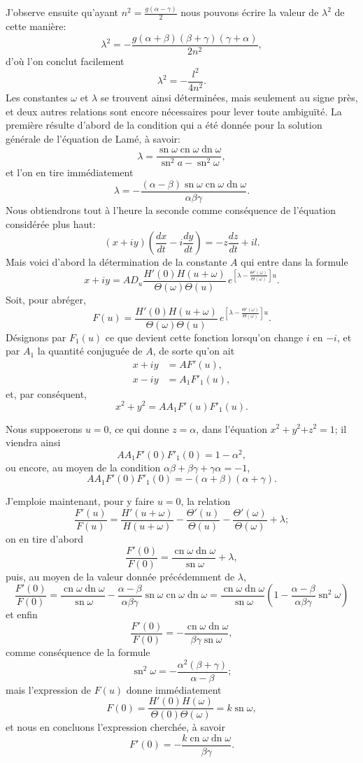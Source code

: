 \documentclass[11pt,leqno,oneside,letterpaper]{book}[2005/09/16]
\DeclareMathOperator{\sn}{sn}
\DeclareMathOperator{\cn}{cn}
\DeclareMathOperator{\dn}{dn}
\begin{document}
J'observe ensuite qu'ayant $n^2 = \frac{g(\alpha - \gamma)}{2}$ nous pouvons \'ecrire la
valeur de $\lambda^2$ de cette mani\`ere:
\[
\lambda^2 = -\frac{g(\alpha + \beta)(\beta + \gamma)(\gamma + \alpha)}{2n^2},
\]
d'o\`u l'on conclut facilement
\[
\lambda^2 = -\frac{l^2}{4n^2}.
\]
Les constantes $\omega$ et $\lambda$ se trouvent ainsi d\'etermin\'ees, mais seulement au
signe pr\`es, et deux autres relations sont encore n\'ecessaires pour lever
toute ambigu\"it\'e. La premi\`ere r\'esulte d'abord de la condition qui a \'et\'e
donn\'ee pour la solution g\'en\'erale de l'\'equation de Lam\'e, \`a savoir:
\[
\lambda = \frac{\sn \omega \cn \omega \dn \omega}{\sn^2 a - \sn^2 \omega},
\]
et l'on en tire imm\'ediatement
\[
\lambda = -\frac{(\alpha - \beta)\sn \omega \cn \omega \dn \omega}{\alpha\beta\gamma}.
\]
Nous obtiendrons tout \`a l'heure la seconde comme cons\'equence de l'\'equation
consid\'er\'ee plus haut:
\[
(x + iy)\left( \frac{dx}{dt} - i\frac{dy}{dt} \right) = -z\frac{dz}{dt} + il.
\]
Mais voici d'abord la d\'etermination de la constante $A$ qui entre dans la
formule
\[
x + iy = AD_u\frac{H'(0) H(u + \omega)}{\Theta(\omega) \Theta(u)}\,
         e^{ \left[ \lambda - \frac{\Theta'(\omega)}{\Theta(\omega)} \right] u }.
\]
Soit, pour abr\'eger,
\[
F(u) = \frac{H'(0) H(u + \omega)}{\Theta(\omega)\Theta(u)}\,
       e^{ \left[ \lambda - \frac{\Theta'(\omega)}{\Theta(\omega)} \right] u }.
\]
D\'esignons par $F_1(u)$ ce que devient cette fonction lorsqu'on change $i$
en $-i$, et par $A_1$ la quantit\'e conjugu\'ee de $A$, de sorte qu'on ait
\begin{align*}
x + iy &= AF'(u),\\
x - iy &= A_1 F'_1(u),
\end{align*}
et, par cons\'equent,
\[
x^2 + y^2 = A A_1 F'(u) F'_1(u).
\]

Nous supposerons $u=0$, ce qui donne $z=\alpha$, dans l'\'equation
$x^2+y^2{+z^2=1}$; il viendra ainsi
\[
A A_1 F'(0) F'_1(0) = 1 - \alpha^2,
\]
ou encore, au moyen de la condition
$\alpha\beta + \beta\gamma + \gamma\alpha = -1$,
\[
A A_1 F'(0) F'_1(0) = -(\alpha + \beta)(\alpha + \gamma).
\]

J'emploie maintenant, pour y faire $u = 0$, la relation
\[
\frac{F'(u)}{F(u)} = \frac{H'(u+\omega)}{H(u+\omega)}
    - \frac{\Theta'(u)}{\Theta(u)}
    - \frac{\Theta'(\omega)}{\Theta(\omega)} + \lambda;
\]
on en tire d'abord
\[
\frac{F'(0)}{F(0)} = \frac{\cn \omega \dn \omega}{\sn \omega} + \lambda,
\]
puis, au moyen de la valeur donn\'ee pr\'ec\'edemment de $\lambda$,
\[
\frac{F'(0)}{F(0)} = \frac{\cn \omega \dn \omega}{\sn \omega}
 - \frac{\alpha - \beta}{\alpha\beta\gamma}\sn \omega \cn \omega \dn \omega
 = \frac{\cn \omega \dn \omega}{\sn \omega}
   \left( 1 - \frac{\alpha - \beta}{\alpha\beta\gamma}\sn^2 \omega \right)
\]
et enfin
\[
\frac{F'(0)}{F(0)} = -\frac{\cn \omega \dn \omega}{\beta \gamma \sn \omega},
\]
comme cons\'equence de la formule
\[
\sn^2 \omega = -\frac{\alpha^2 (\beta + \gamma)}{\alpha-\beta};
\]
mais l'expression de $F(u)$ donne imm\'ediatement
\[
F(0) = \frac{H'(0) H(\omega)}{\Theta(0)\Theta(\omega)} = k\sn \omega,
\]
et nous en concluons l'expression cherch\'ee, \`a savoir
\[
F'(0) = -\frac{k \cn \omega \dn \omega}{\beta\gamma}.
\]
\end{document}

